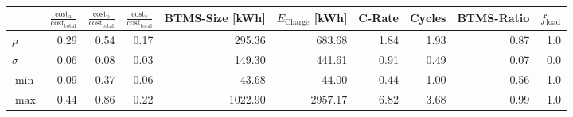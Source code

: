 \begin{tabular}{lrrrrrrrrr}
\toprule
{} &  $\frac{\text{cost}_\text{a}}{\text{cost}_\text{total}}$ &  $\frac{\text{cost}_\text{b}}{\text{cost}_\text{total}}$ &  $\frac{\text{cost}_\text{c}}{\text{cost}_\text{total}}$ &  BTMS-Size [\unit{\kWh}] &  $E_\text{Charge}$ [\unit{\kWh}] &  C-Rate &  Cycles &  BTMS-Ratio &  $f_\text{load}$ \\
\midrule
$\mu$    &                                               0.29 &                                               0.54 &                                               0.17 &                   295.36 &                           683.68 &    1.84 &    1.93 &        0.87 &              1.0 \\
$\sigma$ &                                               0.06 &                                               0.08 &                                               0.03 &                   149.30 &                           441.61 &    0.91 &    0.49 &        0.07 &              0.0 \\
$\min$   &                                               0.09 &                                               0.37 &                                               0.06 &                    43.68 &                            44.00 &    0.44 &    1.00 &        0.56 &              1.0 \\
$\max$   &                                               0.44 &                                               0.86 &                                               0.22 &                  1022.90 &                          2957.17 &    6.82 &    3.68 &        0.99 &              1.0 \\
\bottomrule
\end{tabular}
